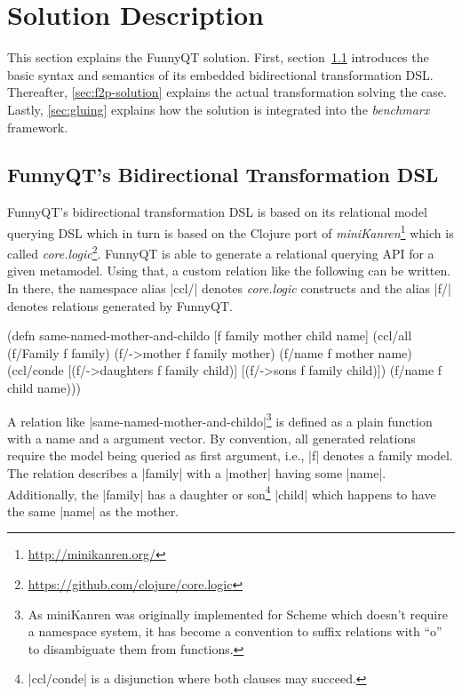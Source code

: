 \documentclass[a4paper]{article}
\newcommand{\code}{\clojureinline}
\begin{document}
\section{Solution Description}
\label{sec:solution-description}

This section explains the FunnyQT solution.  First,
section~\ref{sec:bidi-intro} introduces the basic syntax and semantics of its
embedded bidirectional transformation DSL.  Thereafter, \ref{sec:f2p-solution}
explains the actual transformation solving the case.  Lastly, \ref{sec:gluing}
explains how the solution is integrated into the \emph{benchmarx} framework.


\subsection{FunnyQT's Bidirectional Transformation DSL}
\label{sec:bidi-intro}

FunnyQT's bidirectional transformation DSL is based on its relational model
querying DSL which in turn is based on the Clojure port of
\emph{miniKanren}\footnote{\url{http://minikanren.org/}} which is called
\emph{core.logic}\footnote{\url{https://github.com/clojure/core.logic}}.
FunnyQT is able to generate a relational querying API for a given metamodel.
Using that, a custom relation like the following can be written.  In there, the
namespace alias \code|ccl/| denotes \emph{core.logic} constructs and the alias
\code|f/| denotes relations generated by FunnyQT.

\begin{clojurecode}
(defn same-named-mother-and-childo [f family mother child name]
  (ccl/all
   (f/Family f family)
   (f/->mother f family mother)
   (f/name f mother name)
   (ccl/conde
    [(f/->daughters f family child)]
    [(f/->sons f family child)])
   (f/name f child name)))
\end{clojurecode}

A relation like \code|same-named-mother-and-childo|\footnote{As miniKanren was
  originally implemented for Scheme which doesn't require a namespace system,
  it has become a convention to suffix relations with ``o'' to disambiguate
  them from functions.} is defined as a plain function with a name and a
argument vector.  By convention, all generated relations require the model
being queried as first argument, i.e., \code|f| denotes a family model.  The
relation describes a \code|family| with a \code|mother| having some
\code|name|.  Additionally, the \code|family| has a daughter or
son\footnote{\clojureinline|ccl/conde| is a disjunction where both clauses may
  succeed.} \code|child| which happens to have the same \code|name| as the
mother.
\end{document}
